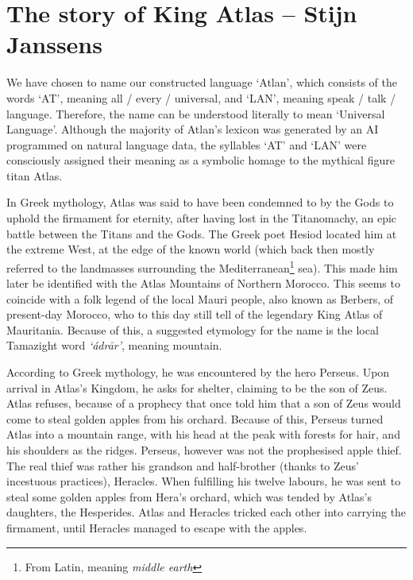 \section{The story of King Atlas -- {\small Stijn Janssens}}

We have chosen to name our constructed language ‘Atlan’, which consists of the words ‘AT’, meaning all / every / universal, and ‘LAN’, meaning speak / talk / language. Therefore, the name can be understood literally to mean ‘Universal Language’. Although the majority of Atlan’s lexicon was generated by an AI programmed on natural language data, the syllables ‘AT’ and ‘LAN’ were consciously assigned their meaning as a symbolic homage to the mythical figure titan Atlas.  

In Greek mythology, Atlas was said to have been condemned to by the Gods to uphold the firmament for eternity, after having lost in the Titanomachy, an epic battle between the Titans and the Gods. The Greek poet Hesiod located him at the extreme West, at the edge of the known world (which back then mostly referred to the landmasses surrounding the Mediterranean\footnote{From Latin, meaning \textit{middle earth}} sea). This made him later be identified with the Atlas Mountains of Northern Morocco. This seems to coincide with a folk legend of the local Mauri people, also known as Berbers, of present-day Morocco, who to this day still tell of the legendary King Atlas of Mauritania.  Because of this, a suggested etymology for the name is the local Tamazight word \textit{‘ádrār’}, meaning mountain.  

According to Greek mythology, he was encountered by the hero Perseus. Upon arrival in Atlas’s Kingdom, he asks for shelter, claiming to be the son of Zeus. Atlas refuses, because of a prophecy that once told him that a son of Zeus would come to steal golden apples from his orchard. Because of this, Perseus turned Atlas into a mountain range, with his head at the peak with forests for hair, and his shoulders as the ridges. Perseus, however was not the prophesised apple thief. The real thief was rather his grandson and half-brother (thanks to Zeus’ incestuous practices), Heracles. When fulfilling his twelve labours, he was sent to steal some golden apples from Hera’s orchard, which was tended by Atlas’s daughters, the Hesperides. Atlas and Heracles tricked each other into carrying the firmament, until Heracles managed to escape with the apples.

